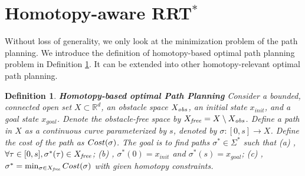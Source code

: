 \documentclass[letterpaper, 10 pt, conference]{ieeeconf}
\newtheorem{defn}{Definition}
\begin{document}
\section{Homotopy-aware RRT$^{*}$}
\label{sec:algorithm}

Without loss of generality, we only look at the minimization problem of the path planning.
We introduce the definition of homotopy-based optimal path planning problem in Definition \ref{def:homo_path_planning}.
It can be extended into other homotopy-relevant optimal path planning.

\begin{defn}{ \textbf{Homotopy-based optimal Path Planning} }
\label{def:homo_path_planning}
Consider a bounded, connected open set $ X \subset \mathbb{R}^{d} $, an obstacle space $ X_{\it obs} $, an initial state $ x_{init} $, and a goal state $ x_{goal} $. 
Denote the obstacle-free space by $ X_{\it free} = X \setminus X_{\it obs} $.
Define a {\em path} in $X$ as a continuous curve parameterized by $s$, denoted by $\sigma : [0,s] \rightarrow X$. 
Define the cost of the path as $ {\sc Cost} (\sigma) $.  
The goal is to find paths $ \sigma^{*} \in \Sigma^{*}$ such that
\textit{ (a) }, $\forall \tau\in[0,s], \sigma^*(\tau) \in X_{\it free}$;
\textit{ (b) }, $ \sigma^{*} (0) = x_{init} $ and $ \sigma^{*} (s) = x_{goal}  $;
\textit{ (c) }, $ \sigma^{*} = \min_{\sigma \in X_{\it free} } {\sc Cost} (\sigma) $ with given homotopy constraints.
\end{defn} 
\end{document}
